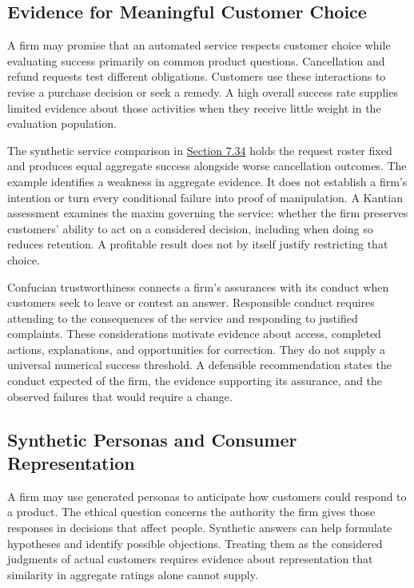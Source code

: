 \hypertarget{M09-evidence-for-meaningful-customer-choice}{%
\subsection{Evidence for Meaningful Customer
Choice}\label{M09-evidence-for-meaningful-customer-choice}}

\noindent \noindent A firm may promise that an automated service respects customer
choice while evaluating success primarily on common product questions.
Cancellation and refund requests test different obligations. Customers
use these interactions to revise a purchase decision or seek a remedy. A
high overall success rate supplies limited evidence about those
activities when they receive little weight in the evaluation population.

The synthetic service comparison in
\href{M07_Prediction_and_Machine_Learning.md}{Section 7.34} holds the
request roster fixed and produces equal aggregate success alongside
worse cancellation outcomes. The example identifies a weakness in
aggregate evidence. It does not establish a firm's intention or turn
every conditional failure into proof of manipulation. A Kantian
assessment examines the maxim governing the service: whether the firm
preserves customers' ability to act on a considered decision, including
when doing so reduces retention. A profitable result does not by itself
justify restricting that choice.

Confucian trustworthiness connects a firm's assurances with its conduct
when customers seek to leave or contest an answer. Responsible conduct
requires attending to the consequences of the service and responding to
justified complaints. These considerations motivate evidence about
access, completed actions, explanations, and opportunities for
correction. They do not supply a universal numerical success threshold.
A defensible recommendation states the conduct expected of the firm, the
evidence supporting its assurance, and the observed failures that would
require a change.

\hypertarget{M09-synthetic-personas-and-consumer-representation}{%
\subsection{Synthetic Personas and Consumer
Representation}\label{M09-synthetic-personas-and-consumer-representation}}

\noindent \noindent A firm may use generated personas to anticipate how customers
could respond to a product. The ethical question concerns the authority
the firm gives those responses in decisions that affect people.
Synthetic answers can help formulate hypotheses and identify possible
objections. Treating them as the considered judgments of actual
customers requires evidence about representation that similarity in
aggregate ratings alone cannot supply.

